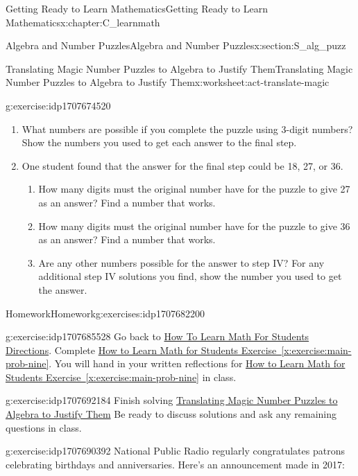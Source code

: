 \documentclass[oneside,10pt,]{book}
\newcommand{\xreffont}{\relax}
\numberwithin{equation}{chapter}
\begin{document}
\begin{chapterptx}{Getting Ready to Learn Mathematics}{}{Getting Ready to Learn Mathematics}{}{}{x:chapter:C_learnmath}
\begin{sectionptx}{Algebra and Number Puzzles}{}{Algebra and Number Puzzles}{}{}{x:section:S_alg_puzz}
\begin{worksheet-subsection}{Translating Magic Number Puzzles to Algebra to Justify Them}{}{Translating Magic Number Puzzles to Algebra to Justify Them}{}{}{x:worksheet:act-translate-magic}
\begin{divisionexercise}{6}{}{}{g:exercise:idp1707674520}
\begin{enumerate}[font=\bfseries,label=(\alph*),ref=\alph*]
\item{}What numbers are possible if you complete the puzzle using 3-digit numbers? Show the numbers you used to get each answer to the final step.%
\item{}One student found that the answer for the final step could be 18, 27, or 36.%
\begin{enumerate}[font=\bfseries,label=(\roman*),ref=\theenumi.\roman*]
\item{}How many digits must the original number have for the puzzle to give 27 as an answer? Find a number that works.%
\item{}How many digits must the original number have for the puzzle to give 36 as an answer? Find a number that works.%
\item{}Are any other numbers possible for the answer to step IV? For any additional step IV solutions you find, show the number you used to get the answer.%
\end{enumerate}
\end{enumerate}
\end{divisionexercise}%
\end{worksheet-subsection}
\restoregeometry
%
%
\typeout{************************************************}
\typeout{************************************************}
%
\begin{exercises-subsection}{Homework}{}{Homework}{}{}{g:exercises:idp1707682200}
\begin{divisionexercise}{1}{}{}{g:exercise:idp1707685528}%
Go back to \hyperlink{x:paragraphs:htlmfs-directions}{How To Learn Math For Students Directions}. Complete \hyperref[x:exercise:main-prob-nine]{How to Learn Math for Students Exercise~{\xreffont\ref{x:exercise:main-prob-nine}}}. You will hand in your written reflections for \hyperref[x:exercise:main-prob-nine]{How to Learn Math for Students Exercise~{\xreffont\ref{x:exercise:main-prob-nine}}} in class.%
\end{divisionexercise}%
\begin{divisionexercise}{2}{}{}{g:exercise:idp1707692184}%
Finish solving \hyperref[x:worksheet:act-translate-magic]{Translating Magic Number Puzzles to Algebra to Justify Them} Be ready to discuss solutions and ask any remaining questions in class.%
\end{divisionexercise}%
\begin{divisionexercise}{3}{}{}{g:exercise:idp1707690392}%
National Public Radio regularly congratulates patrons celebrating birthdays and anniversaries. Here's an announcement made in 2017: \begin{quote}%

\end{quote}
\end{divisionexercise}
\end{exercises-subsection}
\end{sectionptx}
\end{chapterptx}
\end{document}
